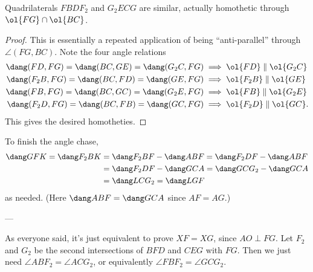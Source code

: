 \begin{claim*}
  Quadrilaterals $FBDF_2$ and $G_2ECG$ are similar,
  actually homothetic through $\ol{FG} \cap \ol{BC}$.
\end{claim*}
\begin{proof}
  This is essentially a repeated application
  of being ``anti-parallel'' through $\angle(FG, BC)$.
  Note the four angle relations
  \begin{align*}
    \dang(FD, FG) = \dang(BC,GE) = \dang(G_2C,FG)
      &\implies \ol{FD} \parallel \ol{G_2C} \\
    \dang(F_2B, FG) = \dang(BC,FD) = \dang(GE,FG)
      &\implies \ol{F_2B} \parallel \ol{GE} \\
    \dang(FB, FG)  = \dang(BC,GC) = \dang(G_2E,FG)
      &\implies \ol{FB} \parallel \ol{G_2E} \\
    \dang(F_2D, FG)  = \dang(BC,FB) = \dang(GC,FG)
      &\implies \ol{F_2D} \parallel \ol{GC}.
  \end{align*}
  This gives the desired homotheties.
\end{proof}
To finish the angle chase,
\begin{align*}
  \dang GFK = \dang F_2BK &= \dang F_2BF - \dang ABF
  = \dang F_2DF - \dang ABF \\
  &= \dang F_2DF - \dang GCA
  = \dang GCG_2 - \dang GCA \\
  &=  \dang LCG_2 = \dang LGF
\end{align*}
as needed.
(Here $\dang ABF = \dang GCA$ since $AF = AG$.)


---


As everyone said, it's just equivalent to prove $XF = XG$,
since $AO \perp FG$.
Let $F_2$ and $G_2$ be the second intersections
of $BFD$ and $CEG$ with $FG$.
Then we just need $\angle ABF_2 = \angle ACG_2$,
or equivalently $\angle FBF_2 = \angle GCG_2$.

